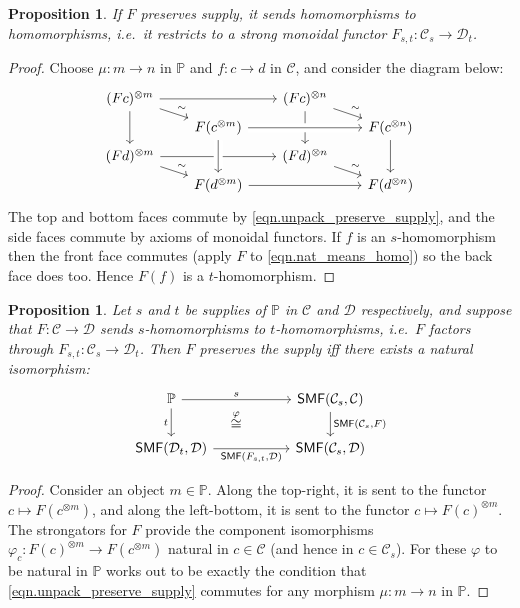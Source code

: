 \documentclass[11pt, oneside, article]{memoir}
\theoremstyle{plain}
\newtheorem{proposition}[theorem]{Proposition}
\theoremstyle{definition}
\theoremstyle{remark}
\newcommand{\cat}[1]{\mathcal{#1}}%
\newcommand{\Cat}[1]{{\mathsf{#1}}}%
\newcommand{\tpow}[1]{^{\otimes #1}}
\newcommand{\smf}{\Cat{SMF}}
\newcommand{\pp}{\mathbb{P}}
\begin{document}
\begin{proposition}
If $F$ preserves supply, it sends homomorphisms to homomorphisms, i.e.\ it restricts to a strong monoidal functor $F_{s,t}\colon\cat{C}_s\to\cat{D}_t$.
\end{proposition}
\begin{proof}
Choose $\mu\colon m\to n$ in $\pp$ and $f\colon c\to d$ in $\cat{C}$, and consider the diagram below:
\[
\begin{tikzcd}[row sep=3pt, column sep=20pt]
	(Fc)\tpow{m}\ar[rr]\ar[dd]\ar[dr, "\sim"]&&
	(Fc)\tpow{n}\ar[dr, "\sim"]\ar[dd]\\&
	F(c\tpow{m})\ar[rr, crossing over]&&
	F(c\tpow{n})\ar[dd]\\
	(Fd)\tpow{m}\ar[rr]\ar[dr, "\sim"]&&
	(Fd)\tpow{n}\ar[dr, "\sim"]\\&
	F(d\tpow{m})\ar[from=uu, crossing over]\ar[rr]&&
	F(d\tpow{n})
\end{tikzcd}
\]
The top and bottom faces commute by \cref{eqn.unpack_preserve_supply}, and the side faces commute by axioms of monoidal functors. If $f$ is an $s$-homomorphism then the front face commutes (apply $F$ to \eqref{eqn.nat_means_homo}) so the back face does too. Hence $F(f)$ is a $t$-homomorphism.
\end{proof}

\begin{proposition}\label{prop.easy_pres_supply}
Let $s$ and $t$ be supplies of $\pp$ in $\cat{C}$ and $\cat{D}$ respectively, and suppose that $F\colon\cat{C}\to\cat{D}$ sends $s$-homomorphisms to $t$-homomorphisms, i.e.\ $F$ factors through $F_{s,t}\colon\cat{C}_s\to\cat{D}_t$. Then $F$ preserves the supply iff there exists a natural isomorphism:
\begin{equation}\label{eqn.pres_supply}
\begin{tikzcd}[column sep=55pt]
	\pp\ar[r, "s"]\ar[d, "t"']&
	\smf(\cat{C}_s,\cat{C})\ar[d, "{\smf(\cat{C}_s,F)}"]\\
	\smf(\cat{D}_t,\cat{D})\ar[r, "{\smf(F_{s,t},\cat{D})}"']&
	\smf(\cat{C}_s,\cat{D})\ar[ul, phantom, "\overset{\varphi}{\cong}"]
\end{tikzcd}
\end{equation}
\end{proposition}
\begin{proof}
Consider an object $m\in\pp$. Along the top-right, it is sent to the functor $c\mapsto F(c\tpow{m})$, and along the left-bottom, it is sent to the functor $c\mapsto F(c)\tpow{m}$. The strongators for $F$ provide the component isomorphisms $\varphi_c\colon F(c)\tpow{m}\to F(c\tpow{m})$ natural in $c\in\cat{C}$ (and hence in $c\in\cat{C}_s$). For these $\varphi$ to be natural in $\pp$ works out to be exactly the condition that  \cref{eqn.unpack_preserve_supply} commutes for any morphism $\mu\colon m\to n$ in $\pp$.
\end{proof}
\end{document}
